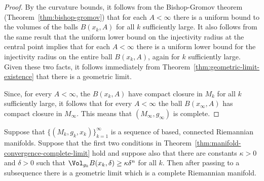 \begin{proof}
\sketch
{}
By the curvature bounds, it follows from the Bishop-Gromov theorem
(Theorem~\ref{thm:bishop-gromov}) that for each $A<\infty$ there is a uniform bound
to the volumes of the balls $B(x_k,A)$ for all $k$ sufficiently large. It also
follows from the same result that  the uniform lower bound on the injectivity
radius at the central point implies that for each $A<\infty$ there is a uniform
lower bound for the injectivity radius on the entire ball $B(x_k,A)$, again for
$k$ sufficiently large. Given these two facts, it follows immediately from
Theorem~\ref{thm:geometric-limit-existence} that there is a geometric limit.

Since, for every $A<\infty$, the $B(x_k,A)$ have compact closure in
$M_k$ for all $k$ sufficiently large, it follows that for every
$A<\infty$ the ball $B(x_\infty,A)$ has compact closure in
$M_\infty$. This means that $(M_\infty,g_\infty)$ is complete.
\end{proof}

\begin{corollary}\label{cor:manifold-convergence-volume-noncollapsed}
\label{2ndmfdconv}

Suppose that $\{(M_k,g_k,x_k)\}_{k=1}^\infty$ is a sequence of based, connected
Riemannian manifolds. Suppose that the first two conditions in
Theorem~\ref{thm:manifold-convergence-complete-limit} hold and suppose also that there are constants $\kappa>0$
and $\delta>0$ such that $\Vol_{g_k}B(x_k,\delta)\ge \kappa\delta^n$ for
all $k$. Then after passing to a subsequence there is a geometric limit which
is a complete Riemannian manifold.
\end{corollary}

